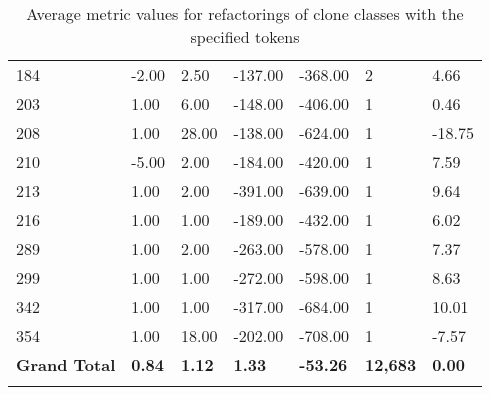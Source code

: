 \begin{appendices}
\begin{longtable}[c]{@{}lllllll@{}}
184 & -2.00 & 2.50 & -137.00 & -368.00 & 2 & 4.66 \\

203 & 1.00 & 6.00 & -148.00 & -406.00 & 1 & 0.46 \\

208 & 1.00 & 28.00 & -138.00 & -624.00 & 1 & -18.75 \\

210 & -5.00 & 2.00 & -184.00 & -420.00 & 1 & 7.59 \\

213 & 1.00 & 2.00 & -391.00 & -639.00 & 1 & 9.64 \\

216 & 1.00 & 1.00 & -189.00 & -432.00 & 1 & 6.02 \\

289 & 1.00 & 2.00 & -263.00 & -578.00 & 1 & 7.37 \\

299 & 1.00 & 1.00 & -272.00 & -598.00 & 1 & 8.63 \\

342 & 1.00 & 1.00 & -317.00 & -684.00 & 1 & 10.01 \\

354 & 1.00 & 18.00 & -202.00 & -708.00 & 1 & -7.57 \\* \midrule
\textbf{Grand Total} & \textbf{0.84} & \textbf{1.12} & \textbf{1.33} & \textbf{-53.26} & \textbf{12,683} & \textbf{0.00} \\* \bottomrule
\caption{Average metric values for refactorings of clone classes with the specified tokens}
\label{tab:full-tokens}\\
\end{longtable}


\end{appendices}
